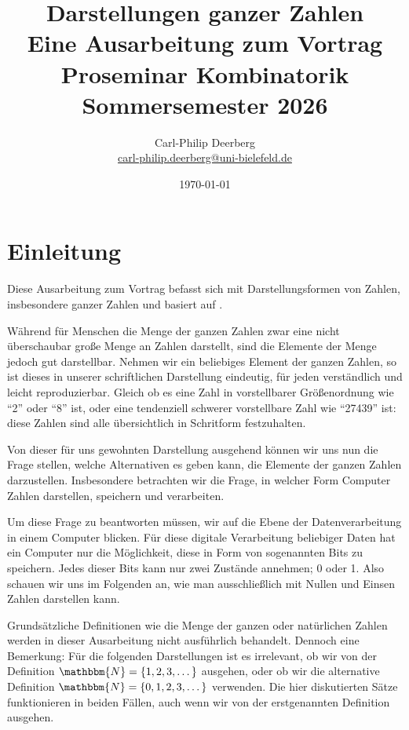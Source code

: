 \documentclass{article}
\title{Darstellungen ganzer Zahlen \\ [0.5em] \Large Eine Ausarbeitung zum Vortrag \\ Proseminar Kombinatorik \\ Sommersemester 2026}
\date{\today}
\author{Carl-Philip Deerberg \\ \url{carl-philip.deerberg@uni-bielefeld.de}}
\newcommand{\N}{\mathbbm{N}} %
\begin{document}
\maketitle
\thispagestyle{empty}
\newpage

\tableofcontents
\newpage



\section{Einleitung}
  Diese Ausarbeitung zum Vortrag befasst sich mit Darstellungsformen von Zahlen, insbesondere ganzer Zahlen und basiert auf \cite{hougardy2018}. 
    
  \vspace{\baselineskip}

  Während für Menschen die Menge der ganzen Zahlen zwar eine nicht überschaubar große Menge an Zahlen darstellt, sind die Elemente der Menge jedoch gut darstellbar.
  Nehmen wir ein beliebiges Element der ganzen Zahlen, so ist dieses in unserer schriftlichen Darstellung eindeutig, für jeden verständlich und leicht reproduzierbar.
  Gleich ob es eine Zahl in vorstellbarer Größenordnung wie ``2'' oder ``8'' ist, oder eine tendenziell schwerer vorstellbare Zahl wie ``27439'' ist: diese Zahlen sind alle übersichtlich in Schritform festzuhalten.
    
  Von dieser für uns gewohnten Darstellung ausgehend können wir uns nun die Frage stellen, welche Alternativen es geben kann, die Elemente der ganzen Zahlen darzustellen.
  Insbesondere betrachten wir die Frage, in welcher Form Computer Zahlen darstellen, speichern und verarbeiten.

  Um diese Frage zu beantworten müssen, wir auf die Ebene der Datenverarbeitung in einem Computer blicken.
  Für diese digitale Verarbeitung beliebiger Daten hat ein Computer nur die Möglichkeit, diese in Form von sogenannten Bits zu speichern.
  Jedes dieser Bits kann nur zwei Zustände annehmen; 0 oder 1. 
  Also schauen wir uns im Folgenden an, wie man ausschließlich mit Nullen und Einsen Zahlen darstellen kann.

  Grundsätzliche Definitionen wie die Menge der ganzen oder natürlichen Zahlen werden in dieser Ausarbeitung nicht ausführlich behandelt.
  Dennoch eine Bemerkung: Für die folgenden Darstellungen ist es irrelevant, ob wir von der Definition $\N = \{1, 2, 3, \dots\}$ ausgehen, oder ob wir die alternative Definition $\N = \{0, 1, 2, 3, \dots\}$ verwenden.
  Die hier diskutierten Sätze funktionieren in beiden Fällen, auch wenn wir von der erstgenannten Definition ausgehen.
\end{document}
